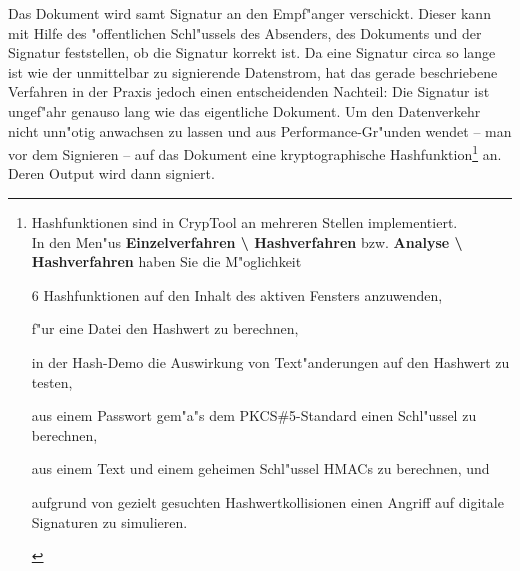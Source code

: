 Das Dokument wird samt Signatur an den Empf"anger verschickt. Dieser kann
mit Hilfe des "offentlichen Schl"ussels des Absenders, des Dokuments und
der Signatur feststellen, ob die Signatur korrekt ist.
Da eine Signatur circa so lange ist wie der unmittelbar zu signierende 
Datenstrom, hat das gerade beschriebene Verfahren in der Praxis jedoch einen
entscheidenden Nachteil: Die Signatur ist ungef"ahr genauso lang wie das
eigentliche Dokument. Um den Datenverkehr nicht unn"otig anwachsen zu
lassen und aus Performance-Gr"unden wendet -- man vor
dem Signieren -- auf das Dokument eine kryptographische 
Hashfunktion\footnote{%
Hashfunktionen sind in CrypTool
an mehreren Stellen implementiert.\\
In den Men"us {\bf Einzelverfahren \textbackslash{} Hashverfahren} bzw.
              {\bf Analyse \textbackslash{} Hashverfahren}
haben Sie die M"oglichkeit
\begin{list}{\textbullet}{\addtolength{\itemsep}{-1.0\baselineskip}}
\item 6 Hashfunktionen auf den Inhalt des aktiven Fensters anzuwenden, \\
\item f"ur eine Datei den Hashwert zu berechnen, \\
\item in der Hash-Demo die Auswirkung von Text"anderungen auf den
      Hashwert zu testen,\\
\item aus einem Passwort gem"a"s dem PKCS\#5-Standard
      einen Schl"ussel zu berechnen, \\
\item aus einem Text und einem geheimen Schl"ussel HMACs zu berechnen, und\\
\item aufgrund von gezielt gesuchten Hashwertkollisionen
      einen Angriff auf digitale Signaturen zu simulieren.
\end{list}
} an. Deren Output wird dann signiert.



\begin{center}
\end{center}
\addtocounter{footnote}{0}

